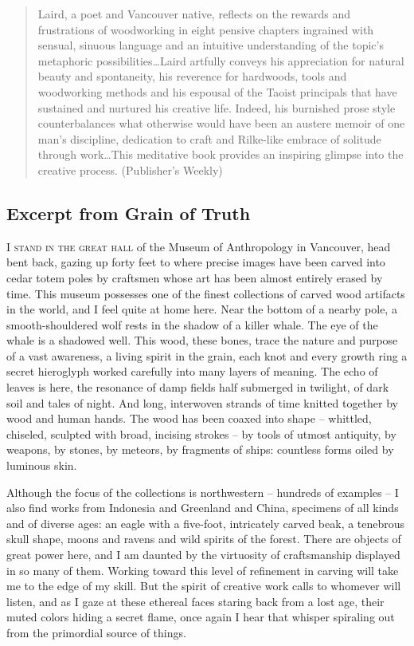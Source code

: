 \documentclass[10pt,DIV09,letterpaper,oneside,headsepline]{scrreprt}
\begin{document}
\begin{quotation} Laird, a poet and Vancouver native, reflects on the rewards and frustrations of woodworking in eight pensive chapters ingrained with sensual, sinuous language and an intuitive understanding of the topic's metaphoric possibilities\ldots Laird artfully conveys his appreciation for natural beauty and spontaneity, his reverence for hardwoods, tools and woodworking methods and his espousal of the Taoist principals that have sustained and nurtured his creative life. Indeed, his burnished prose style counterbalances what otherwise would have been an austere memoir of one man's discipline, dedication to craft and Rilke-like embrace of solitude through work\ldots This meditative book provides an inspiring glimpse into the creative process. (Publisher's Weekly) \end{quotation}

\pagebreak
\subsection{Excerpt from Grain of Truth}

\lettrine[nindent=2pt]{\textcolor[gray]{0.1}{I }}{stand in the great hall }of the Museum of Anthropology in Vancouver, head bent back, gazing up forty feet to where precise images have been carved into cedar totem poles by craftsmen whose art has been almost entirely erased by time. This museum possesses one of the finest collections of carved wood artifacts in the world, and I feel quite at home here. Near the bottom of a nearby pole, a smooth-shouldered wolf rests in the shadow of a killer whale. The eye of the whale is a shadowed well. This wood, these bones, trace the nature and purpose of a vast awareness, a living spirit in the grain, each knot and every growth ring a secret hieroglyph worked carefully into many layers of meaning. The echo of leaves is here, the resonance of damp fields half submerged in twilight, of dark soil and tales of night. And long, interwoven strands of time knitted together by wood and human hands. The wood has been coaxed into shape -- whittled, chiseled, sculpted with broad, incising strokes -- by tools of utmost antiquity, by weapons, by stones, by meteors, by fragments of ships: countless forms oiled by luminous skin.

Although the focus of the collections is northwestern -- hundreds of examples -- I also find works from Indonesia and Greenland and China, specimens of all kinds and of diverse ages: an eagle with a five-foot, intricately carved beak, a tenebrous skull shape, moons and ravens and wild spirits of the forest. There are objects of great power here, and I am daunted by the virtuosity of craftsmanship displayed in so many of them. Working toward this level of refinement in carving will take me to the edge of my skill. But the spirit of creative work calls to whomever will listen, and as I gaze at these ethereal faces staring back from a lost age, their muted colors hiding a secret flame, once again I hear that whisper spiraling out from the primordial source of things.
\end{document}
